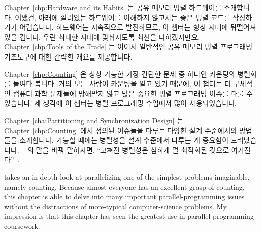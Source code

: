 Chapter~\ref{chp:Hardware and its Habits} 는 공유 메모리 병렬 하드웨어를
소개합니다.
어쨌건, 아래에 깔려있는 하드웨어를 이해하지 않고서는 좋은 병렬 코드를
작성하기가 어렵습니다.
하드웨어는 지속적으로 발전하므로, 이 챕터는 항상 시대에 뒤떨어져 있을 겁니다.
우린 최대한 시대에 맞춰지도록 최선을 다하겠지만요.
Chapter~\ref{chp:Tools of the Trade} 는 이어서 일반적인 공유 메모리 병렬
프로그래밍 기초도구에 대한 간략한 개요를 제공합니다.

\iffalse

This book is a handbook of widely applicable and heavily
used design techniques, rather than
a collection of optimal algorithms with tiny areas of applicability.
You are currently reading \cref{chp:How To Use This Book}, but
you knew that already.
\Cref{chp:Introduction} gives a high-level overview of parallel
programming.

\Cref{chp:Hardware and its Habits} introduces shared-memory
parallel hardware.
After all, it is difficult to write good parallel code unless you
understand the underlying hardware.
Because hardware constantly evolves, this chapter will always be
out of date.
We will nevertheless do our best to keep up.
\Cref{chp:Tools of the Trade} then provides a very brief overview
of common shared-memory parallel-programming primitives.

\fi

Chapter~\ref{chp:Counting} 은 상상 가능한 가장 간단한 문제 중 하나인 카운팅의
병렬화를 들여다 봅니다.
거의 모든 사람이 카운팅을 알고 있기 때문에, 이 챕터는 더 구체적인 컴퓨터 과학
문제들에 방해받지 않고 많은 중요한 병렬 프로그래밍 이슈를 다룰 수 있습니다.
제 생각에 이 챕터는 병렬 프로그래밍 수업에서 많이 사용되었습니다.

Chapter~\ref{cha:Partitioning and Synchronization Design}
는 Chapter~\ref{chp:Counting} 에서 정의된 이슈들을 다루는 다양한 설계
수준에서의 방법들을 소개합니다.
가능할 때에는 병렬성을 설계 수준에서 다루는 게 중요함이 드러났습니다:
~\cite{Dijkstra:1968:LEG:362929.362947} 의 말을
바꿔 말하자면, ``고쳐진 병렬성은 심하게 덜 최적화된 것으로
여겨진다''~\cite{PaulEMcKenney2012HOTPARsuboptimal}.

\iffalse

 takes an in-depth look at parallelizing
one of the simplest problems imaginable, namely counting.
Because almost everyone has an excellent grasp of counting, this chapter
is able to delve into many important parallel-programming issues without
the distractions of more-typical computer-science problems.
My impression is that this chapter has seen the greatest use in
parallel-programming coursework.

